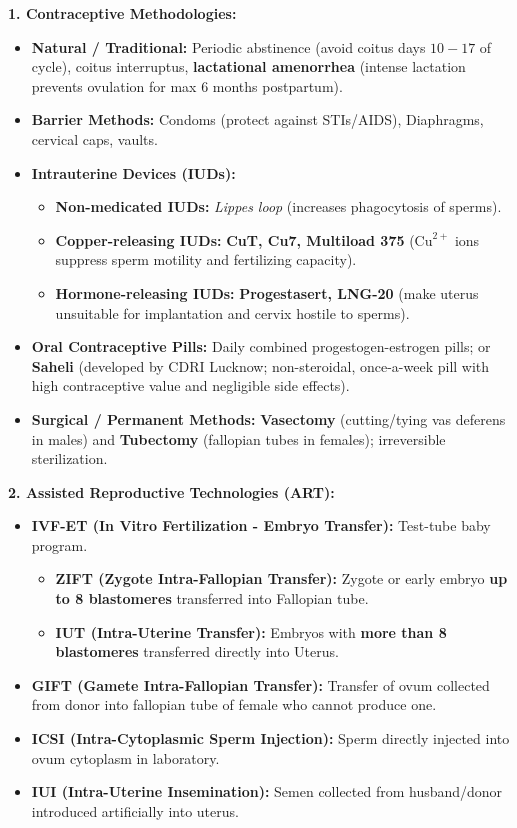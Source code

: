 \documentclass[10pt,a4paper]{article}
\begin{document}
\begin{conceptbox}
\textbf{1. Contraceptive Methodologies:}
\begin{itemize}
  \item \textbf{Natural / Traditional:} Periodic abstinence (avoid coitus days $10-17$ of cycle), coitus interruptus, \textbf{lactational amenorrhea} (intense lactation prevents ovulation for max 6 months postpartum).
  \item \textbf{Barrier Methods:} Condoms (protect against STIs/AIDS), Diaphragms, cervical caps, vaults.
  \item \textbf{Intrauterine Devices (IUDs):}
  \begin{itemize}
    \item \textbf{Non-medicated IUDs:} \textit{Lippes loop} (increases phagocytosis of sperms).
    \item \textbf{Copper-releasing IUDs:} \textbf{CuT, Cu7, Multiload 375} ($\mathrm{Cu}^{2+}$ ions suppress sperm motility and fertilizing capacity).
    \item \textbf{Hormone-releasing IUDs:} \textbf{Progestasert, LNG-20} (make uterus unsuitable for implantation and cervix hostile to sperms).
  \end{itemize}
  \item \textbf{Oral Contraceptive Pills:} Daily combined progestogen-estrogen pills; or \textbf{Saheli} (developed by CDRI Lucknow; non-steroidal, once-a-week pill with high contraceptive value and negligible side effects).
  \item \textbf{Surgical / Permanent Methods:} \textbf{Vasectomy} (cutting/tying vas deferens in males) and \textbf{Tubectomy} (fallopian tubes in females); irreversible sterilization.
\end{itemize}
\textbf{2. Assisted Reproductive Technologies (ART):}
\begin{itemize}
  \item \textbf{IVF-ET (In Vitro Fertilization - Embryo Transfer):} Test-tube baby program.
  \begin{itemize}
    \item \textbf{ZIFT (Zygote Intra-Fallopian Transfer):} Zygote or early embryo \textbf{up to 8 blastomeres} transferred into Fallopian tube.
    \item \textbf{IUT (Intra-Uterine Transfer):} Embryos with \textbf{more than 8 blastomeres} transferred directly into Uterus.
  \end{itemize}
  \item \textbf{GIFT (Gamete Intra-Fallopian Transfer):} Transfer of ovum collected from donor into fallopian tube of female who cannot produce one.
  \item \textbf{ICSI (Intra-Cytoplasmic Sperm Injection):} Sperm directly injected into ovum cytoplasm in laboratory.
  \item \textbf{IUI (Intra-Uterine Insemination):} Semen collected from husband/donor introduced artificially into uterus.
\end{itemize}
\end{conceptbox}
\end{document}
